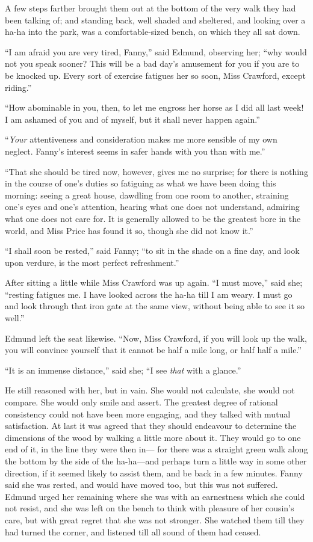 \documentclass{article}
\begin{document}
A few steps farther brought them out at the bottom of the
very walk they had been talking of; and standing back,
well shaded and sheltered, and looking over a ha-ha into
the park, was a comfortable-sized bench, on which they
all sat down.

``I am afraid you are very tired, Fanny,'' said Edmund,
observing her; ``why would not you speak sooner?  This will be
a bad day's amusement for you if you are to be knocked up.
Every sort of exercise fatigues her so soon, Miss Crawford,
except riding.''

``How abominable in you, then, to let me engross her horse
as I did all last week!  I am ashamed of you and of myself,
but it shall never happen again.''

``\emph{Your} attentiveness and consideration makes me more
sensible of my own neglect.  Fanny's interest seems
in safer hands with you than with me.''

``That she should be tired now, however, gives me no surprise;
for there is nothing in the course of one's duties
so fatiguing as what we have been doing this morning:
seeing a great house, dawdling from one room to another,
straining one's eyes and one's attention, hearing what one
does not understand, admiring what one does not care for.
It is generally allowed to be the greatest bore in the world,
and Miss Price has found it so, though she did not
know it.''

``I shall soon be rested,'' said Fanny; ``to sit
in the shade on a fine day, and look upon verdure,
is the most perfect refreshment.''

After sitting a little while Miss Crawford was up again.
``I must move,'' said she; ``resting fatigues me.
I have looked across the ha-ha till I am weary.  I must
go and look through that iron gate at the same view,
without being able to see it so well.''

Edmund left the seat likewise.  ``Now, Miss Crawford,
if you will look up the walk, you will convince yourself
that it cannot be half a mile long, or half half a mile.''

``It is an immense distance,'' said she; ``I see \emph{that}
with a glance.''

He still reasoned with her, but in vain.  She would
not calculate, she would not compare.  She would only
smile and assert.  The greatest degree of rational
consistency could not have been more engaging, and they
talked with mutual satisfaction.  At last it was agreed
that they should endeavour to determine the dimensions
of the wood by walking a little more about it.  They would
go to one end of it, in the line they were then in---%
for there was a straight green walk along the bottom
by the side of the ha-ha---and perhaps turn a little way
in some other direction, if it seemed likely to assist them,
and be back in a few minutes.  Fanny said she was rested,
and would have moved too, but this was not suffered.
Edmund urged her remaining where she was with an
earnestness which she could not resist, and she was left
on the bench to think with pleasure of her cousin's care,
but with great regret that she was not stronger.
She watched them till they had turned the corner,
and listened till all sound of them had ceased.
\end{document}
